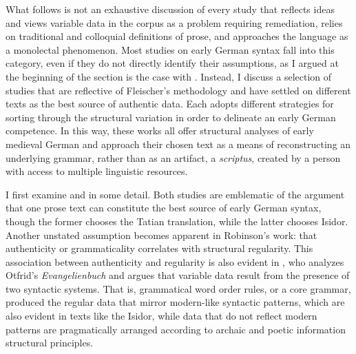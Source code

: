 What follows is not an exhaustive discussion of every study that reflects  ideas and views variable data in the corpus as a problem requiring remediation, relies on traditional and colloquial definitions of prose, and approaches the language as a monolectal phenomenon. Most studies on early German syntax fall into this category, even if they do not directly identify their assumptions, as I argued at the beginning of the section is the case with \citet{Axel2007}. Instead, I discuss a selection of studies that are reflective of Fleischer’s methodology and have settled on different texts as the best source of authentic data. Each adopts different strategies for sorting through the structural variation in order to delineate an early German competence. In this way, these works all offer structural analyses of early medieval German and approach their chosen text as a means of reconstructing an underlying grammar, rather than as an artifact, a \textit{scriptus}, created by a person with access to multiple linguistic resources.

I first examine \citet{PetrovaSolf2009} and \citet{Robinson1997} in some detail. Both studies are emblematic of the argument that one prose text can constitute the best source of early German syntax, though the former chooses the Tatian translation, while the latter chooses Isidor. Another unstated assumption becomes apparent in Robinson’s work: that authenticity or grammaticality correlates with structural regularity. This association between authenticity and regularity is also evident in \citet{Lötscher2009}, who analyzes Otfrid’s \textit{Evangelienbuch} and argues that variable data result from the presence of two syntactic systems. That is, grammatical word order rules, or a core grammar, produced the regular data that mirror modern-like syntactic patterns, which are also evident in texts like the Isidor, while data that do not reflect modern patterns are pragmatically arranged according to archaic and poetic information structural principles.


